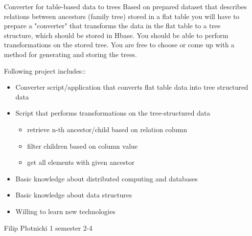 \begin{project}
{Converter for table-based data to trees}
{Based on prepared dataset that describes relations between ancestors (family tree) stored in a flat table you will have to prepare a "converter" that transforms the data in the flat table to a tree structure, which should be stored in Hbase. You should be able to perform transformations on the stored tree. You are free to choose or come up with a method for generating and storing the trees.}
{
Following project includes::
\begin{itemize}
	\item Converter script/application that converts flat table data into tree structured data
	\item Script that performs transformations on the tree-structured data
		\begin{itemize}
			\item retrieve n-th ancestor/child based on relation column
			\item filter children based on column value
			\item get all elements with given ancestor
		\end{itemize}
\end{itemize}
}
{
\begin{itemize}
	\item Basic knowledge about distributed computing and databases
	\item Basic knowledge about data structures
	\item Willing to learn new technologies
\end{itemize}
}
{Filip Płotnicki}
{1 semester}
{2-4}
\end{project}
